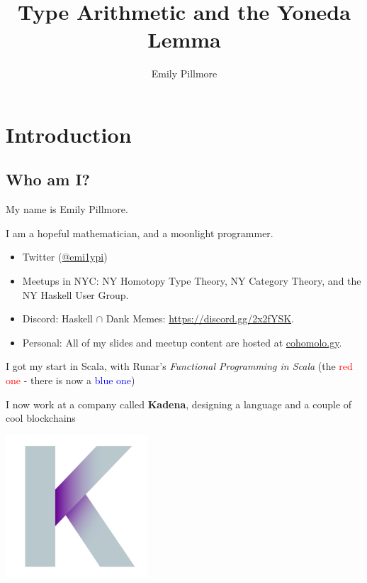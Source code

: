 \documentclass[tikz]{beamer}
\title{Type Arithmetic and the Yoneda Lemma}
\author{Emily Pillmore}
\theoremstyle{definition}
\begin{document}
\frame{\titlepage}

\section[Outline]{}
\frame{\tableofcontents[hideallsubsections]}

\section{Introduction}
\subsection{Who am I?}

\frame
{
	My name is Emily Pillmore.
	
	I am a hopeful mathematician, and a moonlight programmer.
}

\frame
{
	\begin{itemize}
		\item Twitter (\href{https://twitter.com/emi1ypi}{@emi1ypi})
		\item Meetups in NYC: NY Homotopy Type Theory, NY Category Theory, and the NY Haskell User Group. 
		\item Discord: Haskell $\cap$ Dank Memes: \href{https://discord.gg/2x2fYSK}{https://discord.gg/2x2fYSK}. 
		\item Personal: All of my slides and meetup content are hosted at \href{https://github.com/cohomolo-gy}{cohomolo.gy}.
	\end{itemize}
	
}

\frame
{
	I got my start in Scala, with Runar's \textit{Functional Programming in Scala} (the \textcolor{red}{red one} - there is now a \textcolor{blue}{blue one})
}


\frame
{ 
	I now work at a company called \textbf{Kadena}, designing a language and a couple of cool blockchains
	\begin{center}
	
		\includegraphics[scale=0.3]{kadena}
	\end{center}
	
}
\end{document}
